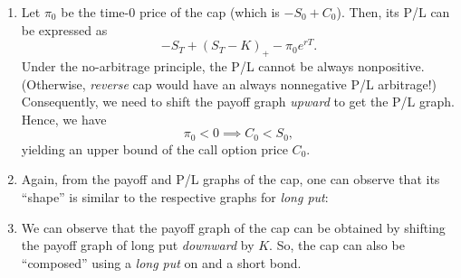 \begin{enumerate}
\item \label{it:call-price-ub}
Let \(\pi_0\) be the time-0 price of the cap (which is \(-S_0+C_0\)). Then,
its P/L can be expressed as
\[
-S_T+(S_T-K)_{+}-\pi_0e^{rT}.
\]
Under the no-arbitrage principle, the P/L cannot be always nonpositive.
(Otherwise, \emph{reverse} cap would have an always nonnegative P/L
 arbitrage!) Consequently, we need to shift the payoff
graph \emph{upward} to get the P/L graph. Hence, we have
\[
\pi_0<0\implies C_0<S_0,
\]
yielding an upper bound of the call option price \(C_0\).

\item Again, from the payoff and P/L graphs of the cap, one can observe
that its ``shape'' is similar to the respective graphs for \emph{long put}:
\begin{center}
\qquad
{}
\end{center}

\item We can observe that the payoff graph of the cap can be obtained by
shifting the payoff graph of long put \emph{downward} by \(K\). So, the cap can
also be ``composed'' using a \emph{long put} on  and a short
bond.


\end{enumerate}
